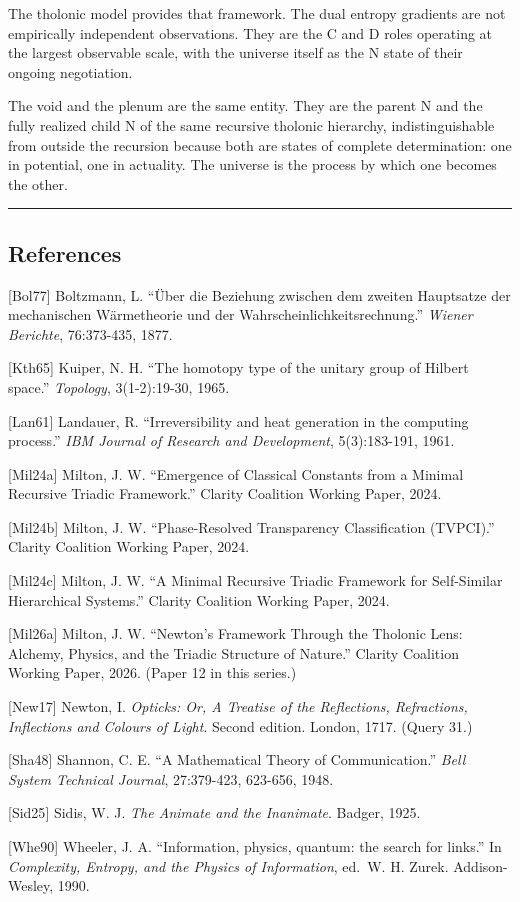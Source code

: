 \documentclass[
  11pt,
  letterpaper,
]{article}
\begin{document}
The tholonic model provides that framework. The dual entropy gradients
are not empirically independent observations. They are the C and D roles
operating at the largest observable scale, with the universe itself as
the N state of their ongoing negotiation.

The void and the plenum are the same entity. They are the parent N and
the fully realized child N of the same recursive tholonic hierarchy,
indistinguishable from outside the recursion because both are states of
complete determination: one in potential, one in actuality. The universe
is the process by which one becomes the other.

\begin{center}\rule{0.5\linewidth}{0.5pt}\end{center}

\subsection{References}\label{references}

{[}Bol77{]} Boltzmann, L. ``Über die Beziehung zwischen dem zweiten
Hauptsatze der mechanischen Wärmetheorie und der
Wahrscheinlichkeitsrechnung.'' \emph{Wiener Berichte}, 76:373-435, 1877.

{[}Kth65{]} Kuiper, N. H. ``The homotopy type of the unitary group of
Hilbert space.'' \emph{Topology}, 3(1-2):19-30, 1965.

{[}Lan61{]} Landauer, R. ``Irreversibility and heat generation in the
computing process.'' \emph{IBM Journal of Research and Development},
5(3):183-191, 1961.

{[}Mil24a{]} Milton, J. W. ``Emergence of Classical Constants from a
Minimal Recursive Triadic Framework.'' Clarity Coalition Working Paper,
2024.

{[}Mil24b{]} Milton, J. W. ``Phase-Resolved Transparency Classification
(TVPCI).'' Clarity Coalition Working Paper, 2024.

{[}Mil24c{]} Milton, J. W. ``A Minimal Recursive Triadic Framework for
Self-Similar Hierarchical Systems.'' Clarity Coalition Working Paper,
2024.

{[}Mil26a{]} Milton, J. W. ``Newton's Framework Through the Tholonic
Lens: Alchemy, Physics, and the Triadic Structure of Nature.'' Clarity
Coalition Working Paper, 2026. (Paper 12 in this series.)

{[}New17{]} Newton, I. \emph{Opticks: Or, A Treatise of the Reflections,
Refractions, Inflections and Colours of Light}. Second edition. London,
1717. (Query 31.)

{[}Sha48{]} Shannon, C. E. ``A Mathematical Theory of Communication.''
\emph{Bell System Technical Journal}, 27:379-423, 623-656, 1948.

{[}Sid25{]} Sidis, W. J. \emph{The Animate and the Inanimate}. Badger,
1925.

{[}Whe90{]} Wheeler, J. A. ``Information, physics, quantum: the search
for links.'' In \emph{Complexity, Entropy, and the Physics of
Information}, ed.~W. H. Zurek. Addison-Wesley, 1990.
\end{document}
